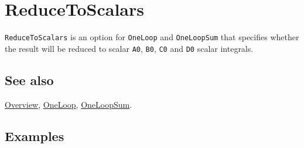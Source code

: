 \documentclass[../FeynCalcManual.tex]{subfiles}
\begin{document}
\hypertarget{reducetoscalars}{%
\section{ReduceToScalars}\label{reducetoscalars}}

\texttt{ReduceToScalars} is an option for \texttt{OneLoop} and
\texttt{OneLoopSum} that specifies whether the result will be reduced to
scalar \texttt{A0}, \texttt{B0}, \texttt{C0} and \texttt{D0} scalar
integrals.

\subsection{See also}

\hyperlink{toc}{Overview}, \hyperlink{oneloop}{OneLoop},
\hyperlink{oneloopsum}{OneLoopSum}.

\subsection{Examples}
\end{document}
